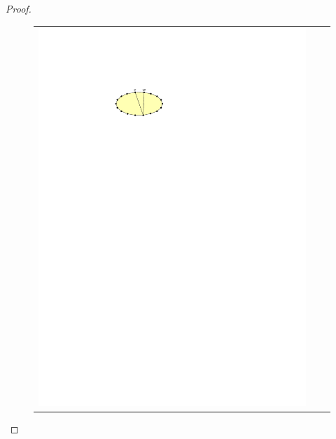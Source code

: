 \documentclass{article}
\theoremstyle{definition}
\begin{document}
\begin{proof}
\begin{figure}
\begin{tabular}{ccc}
      \includegraphics[page=2]{figs/minimal} &

\end{tabular}
\end{figure}
\end{proof}
\end{document}

